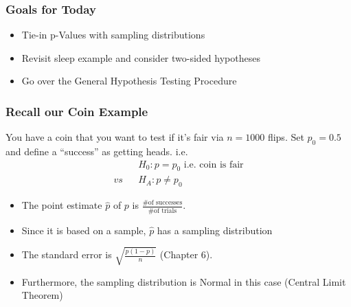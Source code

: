 \documentclass[handout]{beamer}
\begin{document}
\begin{frame}[fragile]
\frametitle{Goals for Today}

\begin{itemize}
\item Tie-in p-Values with sampling distributions
\item Revisit sleep example and consider two-sided hypotheses
\item Go over the General Hypothesis Testing Procedure
\end{itemize}

\end{frame}


%
%
%
%


\begin{frame}
\frametitle{Recall our Coin Example}
You have a coin that you want to test if it's fair via $n=1000$ flips.  Set $p_0 = 0.5$ and define a ``success'' as getting heads.  \pause i.e.
\begin{eqnarray*}
&& H_0: p = p_0 \mbox{ i.e. coin is fair}\\
vs && H_A: p \neq p_0
\end{eqnarray*}

\begin{itemize}
\pause \item The point estimate $\widehat{p}$ of $p$ is $\frac{\mbox{\# of successes}}{\mbox{\# of trials}}$.
\pause \item Since it is based on a sample, $\widehat{p}$ has a sampling distribution
\pause \item The standard error is $\sqrt{\frac{p(1-p)}{n}}$ (Chapter 6).
\pause \item Furthermore, the sampling distribution is Normal in this case (Central Limit Theorem)
\end{itemize}

\end{frame}
\end{document}
